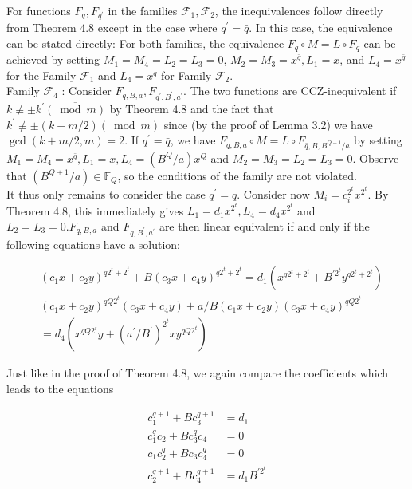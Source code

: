 \documentclass[10pt]{article}
\begin{document}
For functions $F_{q}, F_{q^{\prime}}$ in the families $\mathcal{F}_{1}, \mathcal{F}_{2}$, the inequivalences follow directly from Theorem 4.8 except in the case where $q^{\prime}=\bar{q}$. In this case, the equivalence can be stated directly: For both families, the equivalence $F_{q} \circ M=L \circ F_{\bar{q}}$ can be achieved by setting $M_{1}=M_{4}=L_{2}=L_{3}=0$, $M_{2}=M_{3}=x^{\bar{q}}, L_{1}=x$, and $L_{4}=x^{\bar{q}}$ for the Family $\mathcal{F}_{1}$ and $L_{4}=x^{q}$ for Family $\mathcal{F}_{2}$.\\
Family $\mathcal{F}_{4}$ : Consider $F_{q, B, a}, F_{q^{\prime}, B^{\prime}, a^{\prime}}$. The two functions are CCZ-inequivalent if $k \not \equiv \pm k^{\prime} \overline{(\bmod m)}$ by Theorem 4.8 and the fact that $k^{\prime} \not \equiv \pm(k+m / 2)(\bmod m)$ since (by the proof of Lemma 3.2) we have $\operatorname{gcd}(k+m / 2, m)=2$. If $q^{\prime}=\bar{q}$, we have $F_{q, B, a} \circ M=L \circ F_{\bar{q}, B, B^{Q+1} / a}$ by setting $M_{1}=M_{4}=x^{\bar{q}}, L_{1}=x, L_{4}=\left(B^{Q} / a\right) x^{Q}$ and $M_{2}=M_{3}=L_{2}=L_{3}=0$. Observe that $\left(B^{Q+1} / a\right) \in \mathbb{F}_{Q}$, so the conditions of the family are not violated.\\
It thus only remains to consider the case $q^{\prime}=q$. Consider now $M_{i}=c_{i}^{2^{t}} x^{2^{t}}$. By Theorem 4.8, this immediately gives $L_{1}=d_{1} x^{2^{t}}, L_{4}=d_{4} x^{2^{t}}$ and $L_{2}=L_{3}=0 . F_{q, B, a}$ and $F_{q, B^{\prime}, a^{\prime}}$ are then linear equivalent if and only if the following equations have a solution:

$$
\begin{aligned}
& \left(c_{1} x+c_{2} y\right)^{q 2^{t}+2^{t}}+B\left(c_{3} x+c_{4} y\right)^{q 2^{t}+2^{t}}=d_{1}\left(x^{q 2^{t}+2^{t}}+B^{\prime 2^{t}} y^{q 2^{t}+2^{t}}\right) \\
& \left(c_{1} x+c_{2} y\right)^{q Q 2^{t}}\left(c_{3} x+c_{4} y\right)+a / B\left(c_{1} x+c_{2} y\right)\left(c_{3} x+c_{4} y\right)^{q Q 2^{t}} \\
& =d_{4}\left(x^{q Q 2^{t}} y+\left(a^{\prime} / B^{\prime}\right)^{2^{t}} x y^{q Q 2^{t}}\right)
\end{aligned}
$$

Just like in the proof of Theorem 4.8, we again compare the coefficients which leads to the equations

$$
\begin{aligned}
c_{1}^{q+1}+B c_{3}^{q+1} & =d_{1} \\
c_{1}^{q} c_{2}+B c_{3}^{q} c_{4} & =0 \\
c_{1} c_{2}^{q}+B c_{3} c_{4}^{q} & =0 \\
c_{2}^{q+1}+B c_{4}^{q+1} & =d_{1} B^{\prime 2^{t}}
\end{aligned}
$$
\end{document}
